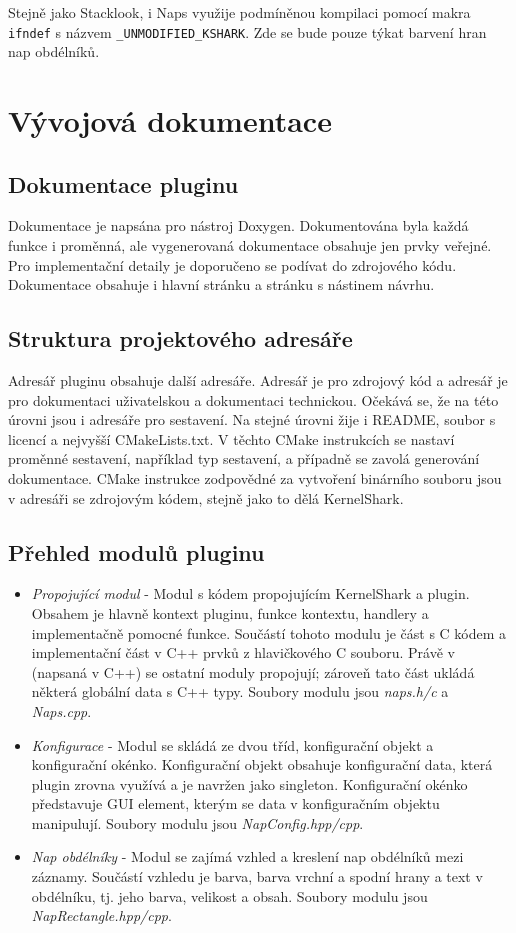 Stejně jako Stacklook, i Naps využije podmíněnou kompilaci pomocí makra \texttt{ifndef} s názvem \texttt{\_UNMODIFIED\_KSHARK}. Zde se bude pouze týkat barvení hran nap obdélníků.

\section{Vývojová dokumentace}

\subsection*{Dokumentace pluginu}
Dokumentace je napsána pro nástroj Doxygen. Dokumentována byla každá funkce i proměnná, ale vygenerovaná dokumentace obsahuje jen prvky veřejné. Pro implementační detaily je doporučeno se podívat do zdrojového kódu. Dokumentace obsahuje i hlavní stránku a stránku s nástinem návrhu.

\subsection*{Struktura projektového adresáře}

Adresář pluginu obsahuje další adresáře. Adresář  je pro zdrojový kód a adresář  je pro dokumentaci uživatelskou a dokumentaci technickou. Očekává se, že na této úrovni jsou i adresáře pro sestavení. Na stejné úrovni žije i README, soubor s licencí a nejvyšší CMakeLists.txt. V těchto CMake instrukcích se nastaví proměnné sestavení, například typ sestavení, a případně se zavolá generování dokumentace. CMake instrukce zodpovědné za vytvoření binárního souboru jsou v adresáři se zdrojovým kódem, stejně jako to dělá KernelShark.

\subsection*{Přehled modulů pluginu}

\begin{itemize}
    \item \emph{Propojující modul} - Modul s kódem propojujícím KernelShark a plugin. Obsahem je hlavně kontext pluginu, funkce kontextu, handlery a implementačně pomocné funkce. Součástí tohoto modulu je část s C kódem a implementační část v C++ prvků z hlavičkového C souboru. Právě v  (napsaná v C++) se ostatní moduly propojují; zároveň tato část ukládá některá globální data s C++ typy. Soubory modulu jsou \emph{naps.h/c} a \emph{Naps.cpp}.
    \item \emph{Konfigurace} - Modul se skládá ze dvou tříd, konfigurační objekt a konfigurační okénko. Konfigurační objekt obsahuje konfigurační data, která plugin zrovna využívá a je navržen jako singleton. Konfigurační okénko představuje GUI element, kterým se data v konfiguračním objektu manipulují. Soubory modulu jsou \emph{NapConfig.hpp/cpp}.
    \item \emph{Nap obdélníky} - Modul se zajímá vzhled a kreslení nap obdélníků mezi záznamy. Součástí vzhledu je barva, barva vrchní a spodní hrany a text v obdélníku, tj. jeho barva, velikost a obsah. Soubory modulu jsou \emph{NapRectangle.hpp/cpp}.
\end{itemize}

